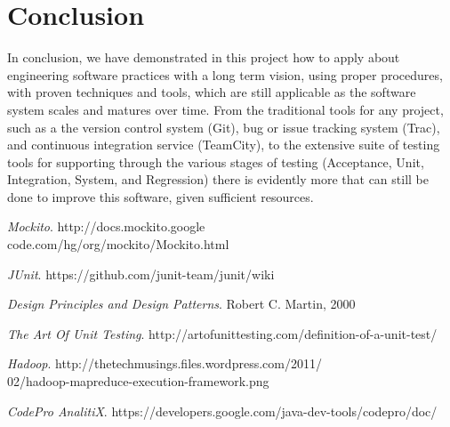 \documentclass[11pt,twocolumn]{article} %
\begin{document}
\section{Conclusion}
In conclusion, we have demonstrated in this project how to apply about engineering software practices
with a long term vision, using proper procedures, with proven techniques and tools, which
are still applicable as the software system scales and matures over time.
From the traditional tools for any project, such as a the version control system (Git), bug
or issue tracking system (Trac), and continuous integration service (TeamCity), to
the extensive suite of testing tools for supporting through the various stages of testing (Acceptance, 
Unit, Integration, System, and Regression) there is evidently more
that can still be done to improve this software, given sufficient resources.

\begin{thebibliography}{9}

  \emph{Mockito}.
  http://docs.mockito.google\\code.com/hg/org/mockito/Mockito.html  

  \emph{JUnit}.
  https://github.com/junit-team/junit/wiki

  \emph{Design Principles and Design Patterns}.
  Robert C. Martin,
  2000

  \emph{The Art Of Unit Testing}.
  http://artofunittesting.com/definition-of-a-unit-test/

  \emph{Hadoop}.
  http://thetechmusings.files.wordpress.com/2011/\\02/hadoop-mapreduce-execution-framework.png
  
  \emph{CodePro AnalitiX}.
  https://developers.google.com/java-dev-tools/codepro/doc/ 
  
\end{thebibliography}
\end{document}
